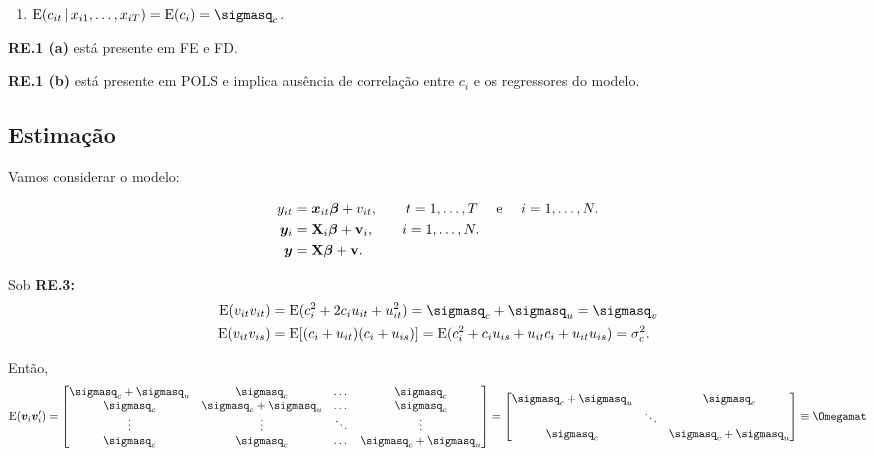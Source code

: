 \documentclass[11pt, oneside, a4paper, article]{article}
\numberwithin{equation}{section}
\begin{document}
\begin{description}
\begin{hypo}[\textbf{RE.3}]
\begin{enumerate}[label =\alph*)]
\item        
$\E( c_{it} \, | \, x_{i1}, \dots, x_{iT} ) = \E( c_{i} ) = \sigmasq_{c}$.
\end{enumerate}
\end{hypo}

\begin{remark} \item
	\textbf{RE.1 (a)} está presente em FE e FD.

\noindent
\textbf{RE.1 (b)} está presente em POLS e implica ausência de correlação entre $c_{i}$ e os regressores do modelo.
\end{remark}

\subsection{Estimação}

Vamos considerar o modelo:

\vspace{-1 em}
\begin{align*} 
y_{it} &= \boldsymbol{x}_{it}\boldsymbol{\beta} + v_{it},
\qquad t = 1, \dots, T \quad \text{ e } \quad i = 1, \dots, N.
\\
\boldsymbol{y}_{i} &= \mathbf{X}_{i}\boldsymbol{\beta} + \mathbf{v}_{i},
\qquad i = 1, \dots, N.
\\
\boldsymbol{y} &= \mathbf{X}\boldsymbol{\beta} + \mathbf{v}.
\end{align*}


Sob \textbf{RE.3:}
\begin{align*} 
\E(v_{it}v_{it}) &= 
\E( c_{i}^{2} + 2c_{i} u_{it} + u_{it}^{2}) =
\sigmasq_{c} + \sigmasq_{u} = \sigmasq_{v}
\\
\E(v_{it}v_{is})	&=
\E[ ( c_{i} + u_{it} ) ( c_{i} + u_{is} ) ]
=
\E( c_{i}^{2} + c_{i} u_{is} + u_{it} c_{i} + u_{it} u_{is} )
=
\sigma_{c}^{2}.
\end{align*}

\noindent
Então, 
\begin{align*}
\E(\mbs{v}_{i} \mbs{v}_{i}') =
\begin{bmatrix}
	\sigmasq_{c} + \sigmasq_{u} & \sigmasq_{c} & \dots & \sigmasq_{c} \\	
	\sigmasq_{c} & \sigmasq_{c} + \sigmasq_{u} & \dots & \sigmasq_{c} \\	
	\vdots & \vdots & \ddots & \vdots \\
	\sigmasq_{c} & \sigmasq_{c} & \dots & \sigmasq_{c} + \sigmasq_{u}
\end{bmatrix}
=
\begin{bmatrix}
\sigmasq_{c} + \sigmasq_{u}  & & \sigmasq_{c} \\	
& \ddots & \\
\sigmasq_{c} & & \sigmasq_{c} + \sigmasq_{u}
\end{bmatrix}
\equiv
\Omegamat
\end{align*}


\end{description}
\end{document}
